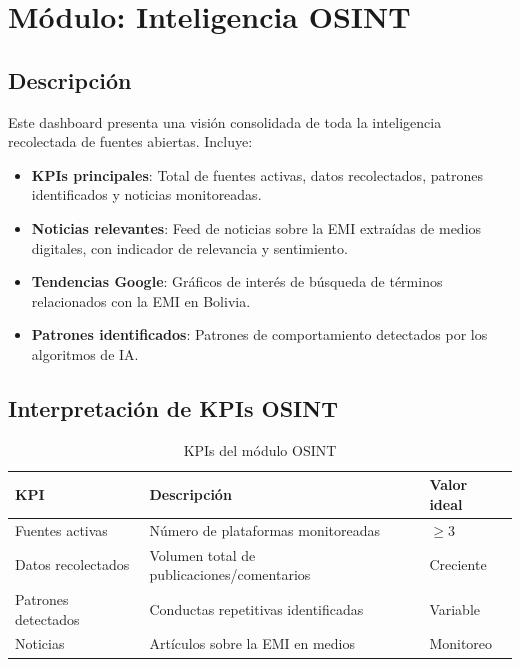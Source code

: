 \documentclass[12pt,a4paper]{article}
\begin{document}
\section{Módulo: Inteligencia OSINT}

\subsection{Descripción}
Este dashboard presenta una visión consolidada de toda la inteligencia recolectada de fuentes abiertas. Incluye:

\begin{itemize}
  \item \textbf{KPIs principales}: Total de fuentes activas, datos recolectados, patrones identificados y noticias monitoreadas.
  \item \textbf{Noticias relevantes}: Feed de noticias sobre la EMI extraídas de medios digitales, con indicador de relevancia y sentimiento.
  \item \textbf{Tendencias Google}: Gráficos de interés de búsqueda de términos relacionados con la EMI en Bolivia.
  \item \textbf{Patrones identificados}: Patrones de comportamiento detectados por los algoritmos de IA.
\end{itemize}

\subsection{Interpretación de KPIs OSINT}
\begin{table}[H]
\centering
\begin{tabularx}{\textwidth}{l X l}
\toprule
\textbf{KPI} & \textbf{Descripción} & \textbf{Valor ideal} \\
\midrule
Fuentes activas & Número de plataformas monitoreadas & $\geq 3$ \\
Datos recolectados & Volumen total de publicaciones/comentarios & Creciente \\
Patrones detectados & Conductas repetitivas identificadas & Variable \\
Noticias & Artículos sobre la EMI en medios & Monitoreo \\
\bottomrule
\end{tabularx}
\caption{KPIs del módulo OSINT}
\end{table}

\end{document}
